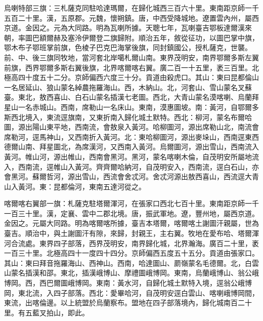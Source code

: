 \begin{pinyinscope}
烏喇特部三旗：三札薩克同駐哈達瑪爾，在歸化城西三百六十里。東南距京師一千五百二十里。漢，五原郡。元魏，懷朔鎮。唐，中西受降城地。遼置雲內州，屬西京道。金因之。元為大同路。明為瓦喇所據。天聰七年，瓦喇臺吉鄂板達爾漢來朝，率圖巴額爾赫及塞泠伊爾登二旗歸附。順治五年，敘從征功，以圖巴掌中旗，鄂木布子鄂班掌前旗，色棱子巴克巴海掌後旗，同封鎮國公，授札薩克，世襲。前、中、後三旗同牧地，當河套北岸噶札爾山南。東界茂明安，南界鄂爾多斯左翼前旗，西界鄂爾多斯右翼後旗，北界喀爾喀右翼。廣二百一十五里，袤三百里。北極高四十度五十二分。京師偏西六度三十分。貢道由殺虎口。其山：東曰昆都倫山一名居延山、狼山蒙名綽農拖羅海山。西，木納山。北，河套山、雪山蒙名叉蘇臺。東北，敖西喜山、白石山蒙名插漢七老圖。西北，大青山蒙名漠喀喇、烏蘭拜星山一名赤城山。西南，席勒山一名床山。東南，漠惠圖坡。南：黃河，自鄂爾多斯西北境入，東流逕旗南，又東折南入歸化城土默特。西北：柳河，蒙名布爾哈圖，源出陽山東平地，西南流，會敖泉入黃河。哈柳圖河，源出席勒山北，南流會席勒河，逕馬神山，又西南折入黃河。北：東哈柳圖河，源出麥垛山，西南逕東西德爾山南、拜星圖北，為席漢河，又西南入黃河。烏爾圖河，源出雪山，西南流入黃河。帷山河，源出帷山，西南會黑河。黑河，蒙名喀喇木倫，自茂明安所屬地流入，西南流，逕帷山入黃河。齊齊爾哈納河，自茂明安入，西南流，逕白石山，亦會黑河。蘇爾哲河，源出雪山，西流會舍忒河。舍忒河源出敖西喜山，西流逕大青山入黃河。東：昆都倫河，東南五達河從之。

喀爾喀右翼部一旗：札薩克駐塔爾渾河，在張家口西北七百十里。東南距京師一千一百三十里。漢，定襄、雲中二郡北境。唐，振武軍地。遼，豐州地，屬西京道。金因之。元屬大同路。明為喀爾喀所據，臺吉本塔爾，喀爾喀土謝圖汗親屬，世為臺吉。順治中，與土謝圖汗有隙，來歸，封親王，主右翼。牧地在愛布哈、塔爾渾河合流處。東界四子部落，西界茂明安，南界歸化城，北界瀚海。廣百二十里，袤一百三十里。北極高四十一度四十四分。京師偏西五度五十五分。貢道由張家口。其山：東曰拜音拖羅海山、西神山。西南，哈達圖山、罽嶺蒙名毛德爾。北，白雲山蒙名插漢和邵。東北，插漢峨博山、摩禮圖峨博岡。東南，烏蘭峨博山、翁公峨博岡。西，西巴爾圖峨博岡。東南：黃水河，自歸化城土默特入境，逕翁公峨博岡，東北流，入四子部落。西北：愛畢哈河，自茂明安逕白雲山、喀喇峨博岡間，東流，出喀倫邊。以上統盟於烏蘭察布。盟地在四子部落境內，歸化城南百二十里。有五藍叉拍山，即此。


\end{pinyinscope}
